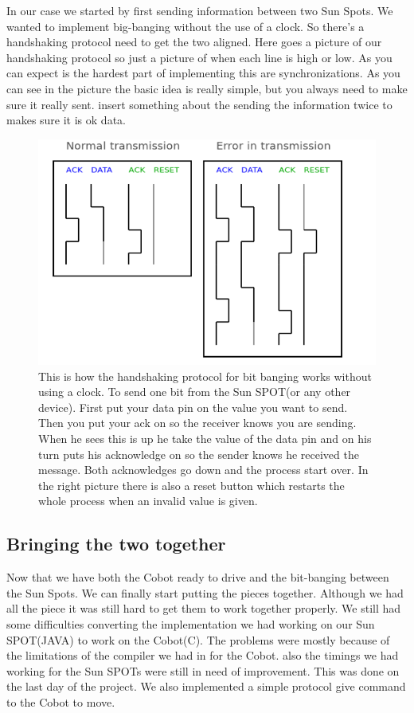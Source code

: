 \documentclass[a4,english]{article}
\begin{document}
In our case we started by first sending information between two Sun Spots. We wanted to implement big-banging without the use of a clock. So there's a handshaking protocol need to get the two aligned. Here goes a picture of our handshaking protocol so just a picture of when each line is high or low.
As you can expect is the hardest part of implementing this are synchronizations. As you can see in the picture the basic idea is really simple, but you always need to make sure it really sent. insert something about the sending the information twice to makes sure it is ok data.
\begin{figure}
\label{fig:handshaking}
\includegraphics[scale = 0.5]{handshaking.png}
\caption{This is how the handshaking protocol for bit banging works without using a clock. To send one bit from the Sun SPOT(or any other device). First put your data pin on the value you want to send. Then you put your ack on so the receiver knows you are sending. When he sees this is up he take the value of the data pin and on his turn puts his acknowledge on so the sender knows he received the message. Both acknowledges go down and the process start over. In the right picture there is also a reset button which restarts the whole process when an invalid value is given. }
\end{figure}

\subsection{Bringing the two together}
\label{subsec:together}
Now that we have both the Cobot ready to drive and the bit-banging between the Sun Spots. We can finally start putting the pieces together. Although we had all the piece it was still hard to get them to work together properly. We still had some difficulties converting the implementation we had working on our Sun SPOT(JAVA) to work on the Cobot(C). The problems were mostly because of the limitations of the compiler we had in for the Cobot. also the timings we had working for the Sun SPOTs were still in need of improvement. This was done on the last day of the project. We also implemented a simple protocol give command to the Cobot to move. 
\end{document}
